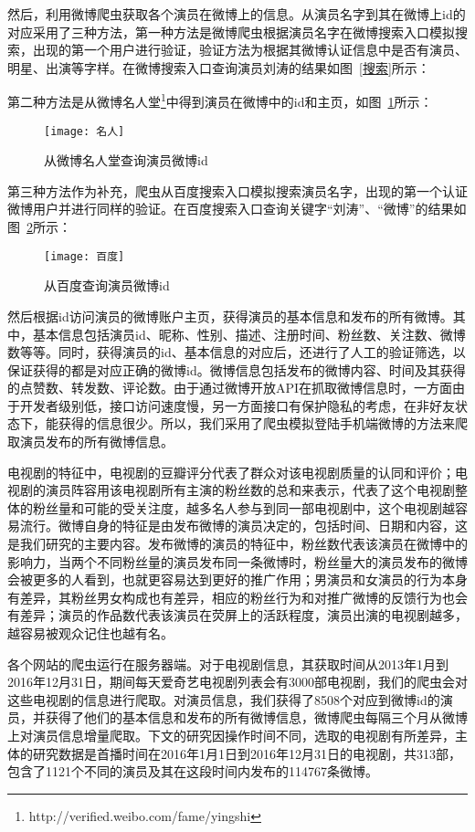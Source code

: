 然后，利用微博爬虫获取各个演员在微博上的信息。从演员名字到其在微博上id的对应采用了三种方法，第一种方法是微博爬虫根据演员名字在微博搜索入口模拟搜索，出现的第一个用户进行验证，验证方法为根据其微博认证信息中是否有演员、明星、出演等字样。在微博搜索入口查询演员刘涛的结果如图~\ref{搜索}所示：

第二种方法是从微博名人堂\footnote{http://verified.weibo.com/fame/yingshi}中得到演员在微博中的id和主页，如图~\ref{名人}所示：

\begin{figure}[!htbp]
\centering
\texttt{[image: 名人]}
\caption{从微博名人堂查询演员微博id}
\label{名人}
\end{figure}

第三种方法作为补充，爬虫从百度搜索入口模拟搜索演员名字，出现的第一个认证微博用户并进行同样的验证。在百度搜索入口查询关键字“刘涛”、“微博”的结果如图~\ref{百度}所示：

\begin{figure}[!htbp]
\centering
\texttt{[image: 百度]}
\caption{从百度查询演员微博id}
\label{百度}
\end{figure}

然后根据id访问演员的微博账户主页，获得演员的基本信息和发布的所有微博。其中，基本信息包括演员id、昵称、性别、描述、注册时间、粉丝数、关注数、微博数等等。同时，获得演员的id、基本信息的对应后，还进行了人工的验证筛选，以保证获得的都是对应正确的微博id。微博信息包括发布的微博内容、时间及其获得的点赞数、转发数、评论数。由于通过微博开放API在抓取微博信息时，一方面由于开发者级别低，接口访问速度慢，另一方面接口有保护隐私的考虑，在非好友状态下，能获得的信息很少。所以，我们采用了爬虫模拟登陆手机端微博的方法来爬取演员发布的所有微博信息。

电视剧的特征中，电视剧的豆瓣评分代表了群众对该电视剧质量的认同和评价；电视剧的演员阵容用该电视剧所有主演的粉丝数的总和来表示，代表了这个电视剧整体的粉丝量和可能的受关注度，越多名人参与到同一部电视剧中，这个电视剧越容易流行。微博自身的特征是由发布微博的演员决定的，包括时间、日期和内容，这是我们研究的主要内容。发布微博的演员的特征中，粉丝数代表该演员在微博中的影响力，当两个不同粉丝量的演员发布同一条微博时，粉丝量大的演员发布的微博会被更多的人看到，也就更容易达到更好的推广作用；男演员和女演员的行为本身有差异，其粉丝男女构成也有差异，相应的粉丝行为和对推广微博的反馈行为也会有差异；演员的作品数代表该演员在荧屏上的活跃程度，演员出演的电视剧越多，越容易被观众记住也越有名。

各个网站的爬虫运行在服务器端。对于电视剧信息，其获取时间从2013年1月到2016年12月31日，期间每天爱奇艺电视剧列表会有3000部电视剧，我们的爬虫会对这些电视剧的信息进行爬取。对演员信息，我们获得了8508个对应到微博id的演员，并获得了他们的基本信息和发布的所有微博信息，微博爬虫每隔三个月从微博上对演员信息增量爬取。下文的研究因操作时间不同，选取的电视剧有所差异，主体的研究数据是首播时间在2016年1月1日到2016年12月31日的电视剧，共313部，包含了1121个不同的演员及其在这段时间内发布的114767条微博。


